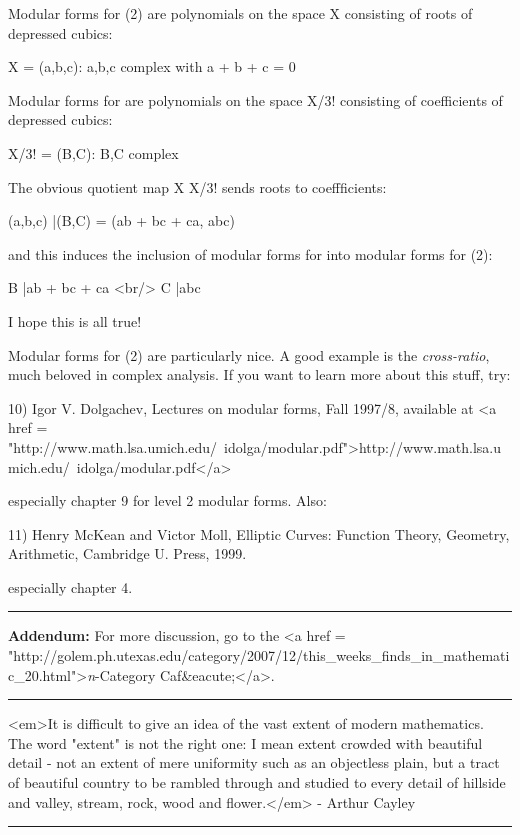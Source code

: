 Modular forms for \Gamma (2) are polynomials on the space X
consisting of roots of depressed cubics:

X = {(a,b,c): a,b,c complex with a + b + c = 0}

Modular forms for \Gamma  are polynomials on the space X/3!
consisting of coefficients of depressed cubics:

X/3! = {(B,C): B,C complex}

The obvious quotient map X \to  X/3! sends roots to coeffficients:

(a,b,c) |\to  (B,C) = (ab + bc + ca, abc)

and this induces the inclusion of modular forms for \Gamma  into
modular forms for \Gamma (2):

B |\to  ab + bc + ca  <br/>
C |\to  abc

I hope this is all true!

Modular forms for \Gamma (2) are particularly nice.   A good example
is the \emph{cross-ratio}, much beloved in complex analysis.  If you want
to learn more about this stuff, try:

10) Igor V. Dolgachev, Lectures on modular forms, Fall 1997/8, 
available at <a href = "http://www.math.lsa.umich.edu/~idolga/modular.pdf">http://www.math.lsa.umich.edu/~idolga/modular.pdf</a>

especially chapter 9 for level 2 modular forms.  Also:

11) Henry McKean and Victor Moll, Elliptic Curves: Function Theory,
Geometry, Arithmetic, Cambridge U. Press, 1999.

especially chapter 4.

\par\noindent\rule{\textwidth}{0.4pt}
\textbf{Addendum:} For more discussion, go to the
<a href = "http://golem.ph.utexas.edu/category/2007/12/this_weeks_finds_in_mathematic_20.html">\emph{n}-Category Caf&eacute;</a>.

\par\noindent\rule{\textwidth}{0.4pt}
<em>It is difficult to give an idea of the vast extent of modern mathematics.
The word "extent" is not the right one: I mean extent crowded with 
beautiful detail - not an extent of mere uniformity such as an objectless
plain, but a tract of beautiful country to be rambled through and studied
to every detail of hillside and valley, stream, rock, wood and flower.</em> 
- Arthur Cayley
\par\noindent\rule{\textwidth}{0.4pt}

